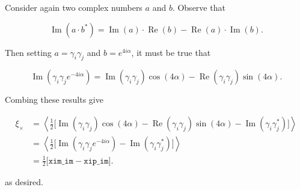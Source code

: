 \documentclass[%
 reprint,
 amsmath,amssymb,
 aps,nofootinbib
]{revtex4-1}
\begin{document}
Consider again two complex numbers $a$ and $b$. Observe that

$$\operatorname{Im}(a\cdot b^*)=\operatorname{Im}(a)\cdot\operatorname{Re}(b)-\operatorname{Re}(a)\cdot\operatorname{Im}(b).$$

Then setting $a=\gamma_i\gamma_j$ and $b=e^{4i\alpha}$, it must be true that

$$\operatorname{Im}\left(\gamma_i\gamma_je^{-4i\alpha}\right)=\operatorname{Im}(\gamma_i\gamma_j)\cos(4\alpha)-\operatorname{Re}(\gamma_i\gamma_j)\sin(4\alpha).$$

Combing these results give

\begin{align*}
\xi_\times&=\left<\frac{1}{2}\big[\operatorname{Im}(\gamma_i\gamma_j)\cos(4\alpha)-\operatorname{Re}(\gamma_i\gamma_j)\sin(4\alpha)-\operatorname{Im}(\gamma_i\gamma_j^*)\big]\right>\\
&=\left<\frac{1}{2}\big[\operatorname{Im}\left(\gamma_i\gamma_je^{-4i\alpha}\right)-\operatorname{Im}(\gamma_i\gamma_j^*)\big]\right>\\
&=\frac{1}{2}\big[\texttt{xim\_im}-\texttt{xip\_im}\big].
\end{align*}

as desired.
\end{document}
